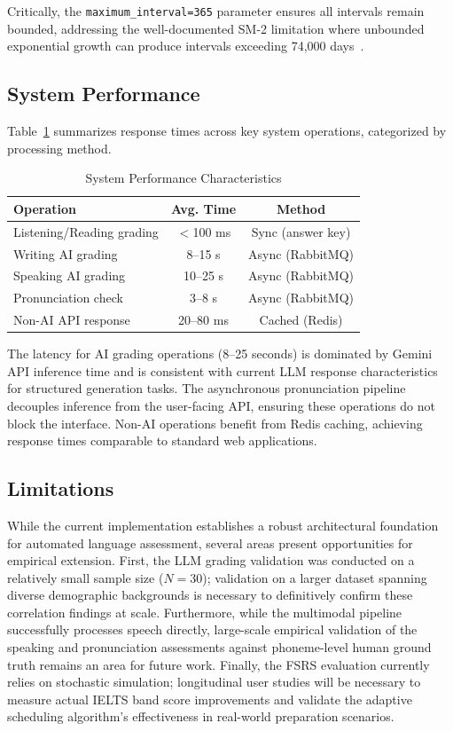 \documentclass{IEEEtran}
\begin{document}
Critically, the \texttt{maximum\_interval=365} parameter ensures all intervals remain bounded, addressing the well-documented SM-2 limitation where unbounded exponential growth can produce intervals exceeding 74{,}000 days~\cite{sm2}.

\subsection{System Performance}

Table~\ref{tab:performance} summarizes response times across key system operations, categorized by processing method.

\begin{table}[!t]
\caption{System Performance Characteristics}
\label{tab:performance}
\centering
\begin{tabular}{lcc}
\toprule
\textbf{Operation} & \textbf{Avg. Time} & \textbf{Method} \\
\midrule
Listening/Reading grading & $<$100 ms  & Sync (answer key) \\
Writing AI grading        & 8--15 s    & Async (RabbitMQ) \\
Speaking AI grading       & 10--25 s   & Async (RabbitMQ) \\
Pronunciation check       & 3--8 s     & Async (RabbitMQ) \\
Non-AI API response       & 20--80 ms  & Cached (Redis) \\
\bottomrule
\end{tabular}
\end{table}

The latency for AI grading operations (8--25 seconds) is dominated by Gemini API inference time and is consistent with current LLM response characteristics for structured generation tasks. The asynchronous pronunciation pipeline decouples inference from the user-facing API, ensuring these operations do not block the interface. Non-AI operations benefit from Redis caching, achieving response times comparable to standard web applications.

\subsection{Limitations}

While the current implementation establishes a robust architectural foundation for automated language assessment, several areas present opportunities for empirical extension. First, the LLM grading validation was conducted on a relatively small sample size ($N=30$); validation on a larger dataset spanning diverse demographic backgrounds is necessary to definitively confirm these correlation findings at scale. Furthermore, while the multimodal pipeline successfully processes speech directly, large-scale empirical validation of the speaking and pronunciation assessments against phoneme-level human ground truth remains an area for future work. Finally, the FSRS evaluation currently relies on stochastic simulation; longitudinal user studies will be necessary to measure actual IELTS band score improvements and validate the adaptive scheduling algorithm's effectiveness in real-world preparation scenarios.
\end{document}
